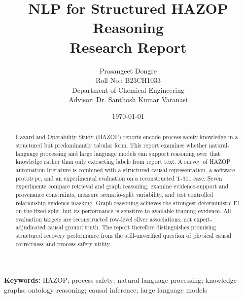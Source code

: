\documentclass[10pt,a4paper]{report}
\title{NLP for Structured HAZOP Reasoning\\[0.4em]
\large Research Report}
\author{Prasangeet Dongre\\
\small Roll No.: B23CH1033\\
\small Department of Chemical Engineering\\
\small Advisor: Dr. Santhosh Kumar Varanasi}
\date{\today}
\begin{document}
\maketitle

\begin{abstract}
Hazard and Operability Study (HAZOP) reports encode process-safety knowledge
in a structured but predominantly tabular form. This report examines whether
natural-language processing and large language models can support reasoning
over that knowledge rather than only extracting labels from report text. A
survey of HAZOP automation literature is combined with a structured causal
representation, a software prototype, and an experimental evaluation on a
reconstructed T-301 case. Seven experiments compare retrieval and graph
reasoning, examine evidence-support and provenance constraints, measure
scenario-split variability, and test controlled relationship-evidence
masking. Graph reasoning achieves the strongest deterministic F1 on the
fixed split, but its performance is sensitive to available training evidence.
All evaluation targets are reconstructed row-level silver associations,
not expert-adjudicated causal ground truth. The report therefore distinguishes
promising structured recovery performance from the still-unverified question
of physical causal correctness and process-safety utility.
\end{abstract}

\noindent\textbf{Keywords:} HAZOP; process safety; natural-language processing;
knowledge graphs; ontology reasoning; causal inference; large language models

\clearpage
{}
\tableofcontents
\listoffigures
\clearpage
{}






\small


\end{document}
